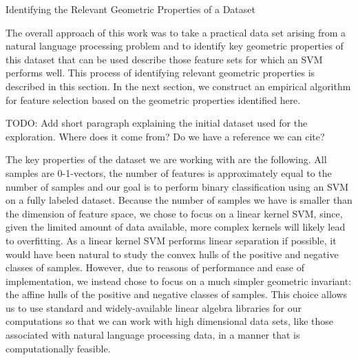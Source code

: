 \documentclass{llncs}
\begin{document}
\begin{section}{Identifying the Relevant Geometric Properties of a Dataset}

The overall approach of this work was to take a practical data set arising from a natural language processing problem and to identify key geometric properties of this dataset that can be used describe those feature sets for which an SVM performs well. This process of identifying relevant geometric properties is described in this section. In the next section, we construct an empirical algorithm for feature selection based on the geometric properties identified here.

TODO: Add short paragraph explaining the initial dataset used for the exploration. Where does it come from? Do we have a reference we can cite? 

The key properties of the dataset we are working with are the following. All samples are 0-1-vectors, the number of features is approximately equal to the number of samples and our goal is to perform binary classification using an SVM on a fully labeled dataset. Because the number of samples we have is smaller than the dimension of feature space, we chose to focus on a linear kernel SVM, since, given the limited amount of data available, more complex kernels will likely lead to overfitting. As a linear kernel SVM performs linear separation if possible, it would have been natural to study the convex hulls of the positive and negative classes of samples. However, due to reasons of performance and ease of implementation, we instead chose to focus on a much simpler geometric invariant: the affine hulls of the positive and negative classes of samples. This choice allows us to use standard and widely-available linear algebra libraries for our computations so that we can work with high dimensional data sets, like those associated with natural language processing data, in a manner that is computationally feasible.


\end{section}
\end{document}
